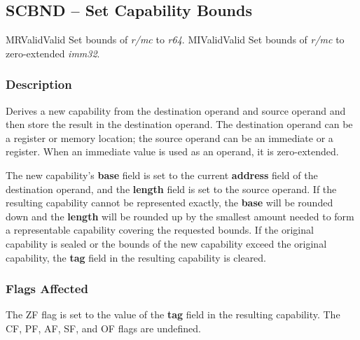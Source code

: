 \clearpage
{}
{}
\subsection*{SCBND -- Set Capability Bounds}

\begin{x86opcodetable}
  {MR}{Valid}{Valid}
  {Set bounds of \emph{r/mc} to \emph{r64}.}
  {MI}{Valid}{Valid}
  {Set bounds of \emph{r/mc} to zero-extended \emph{imm32}.}
\end{x86opcodetable}

\begin{x86opentable}
\end{x86opentable}

\subsubsection*{Description}

Derives a new capability from the destination operand and source
operand and then store the result in the destination operand.  The
destination operand can be a register or memory location; the source
operand can be an immediate or a register.  When an immediate value is
used as an operand, it is zero-extended.

The new capability's \textbf{base} field is set to the current
\textbf{address} field of the destination operand, and the
\textbf{length} field is set to the source operand.  If the resulting
capability cannot be represented exactly, the \textbf{base} will be
rounded down and the \textbf{length} will be rounded up by the
smallest amount needed to form a representable capability covering the
requested bounds.  If the original capability is sealed or the bounds
of the new capability exceed the original capability, the \textbf{tag}
field in the resulting capability is cleared.

\subsubsection*{Flags Affected}

The ZF flag is set to the value of the \textbf{tag} field in the
resulting capability.  The CF, PF, AF, SF, and OF flags are undefined.
